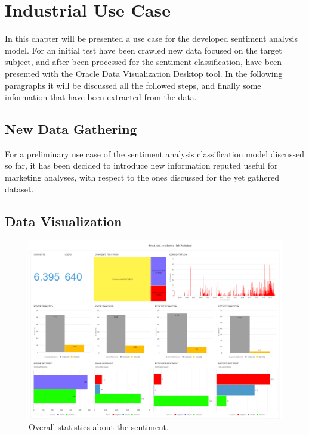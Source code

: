 \chapter{Industrial Use Case}
\label{industrial-use-case}

In this chapter will be presented a use case for the developed sentiment analysis model. For an initial test have been crawled new data focused on the target subject, and after been processed for the sentiment classification, have been presented with the Oracle Data Visualization Desktop tool. In the following paragraphs it will be discussed all the followed steps, and finally some information that have been extracted from the data.

\section{New Data Gathering}

For a preliminary use case of the sentiment analysis classification model discussed so far, it has been decided to introduce new information reputed useful for marketing analyses, with respect to the ones discussed for the yet gathered dataset. 



\section{Data Visualization}


\begin{figure}[ht]
	\centering
	\includegraphics[width=\textwidth]{figures/odv_export/dataset_data_visualization_1.pdf}
	\caption{Overall statistics about the sentiment.}
	\label{fig:preliminar-info}
\end{figure}


